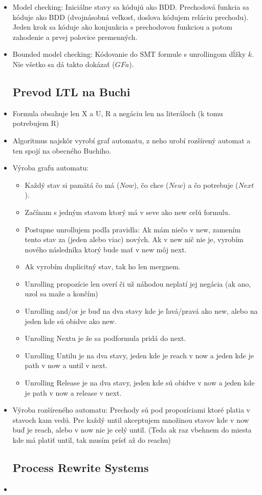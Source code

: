 \documentclass[paper=a4, fontsize=11pt]{scrartcl} %
\numberwithin{equation}{section} %
\numberwithin{figure}{section} %
\numberwithin{table}{section} %
\begin{document}
\begin{itemize}
	\item Model checking: Iniciálne stavy sa kódujú ako BDD. Prechodová funkcia sa kóduje ako BDD (dvojnásobná veľkosť, doslova kódujem reláciu prechodu). Jeden krok sa kóduje ako konjunkcia s prechodovou funkciou a potom zahodenie a prvej polovice premenných.
	
	\item Bounded model checking: Kódovanie do SMT formule s unrollingom dĺžky $k$. Nie všetko sa dá takto dokázať ($GF a$).
	
	\subsection{Prevod LTL na Buchi}
	
	\item Formula obsahuje len X a U, R a negáciu len na literáloch (k tomu potrebujem R)
	
	\item Algoritmus najskôr vyrobí graf automatu, z neho urobí rozšírený automat a ten spojí na obecného Buchiho.
	
	\item Výroba grafu automatu:
	
	\begin{itemize}
		\item Každý stav si pamätá čo má ($Now$), čo chce ($New$) a čo potrebuje ($Next$).
		\item Začínam s jedným stavom ktorý má v seve ako new celú formulu.
		\item Postupne unrollujem podľa pravidla: Ak mám niečo v new, zamením tento stav za (jeden alebo viac) nových. Ak v new nič nie je, vyrobím nového následníka ktorý bude mať v new môj next.
		\item Ak vyrobím duplicitný stav, tak ho len mergnem.
		\item Unrolling propozície len overí či už náhodou neplatí jej negácia (ak ano, uzol sa maže a končím)
		\item Unrolling and/or je buď na dva stavy kde je ľavá/pravá ako new, alebo na jeden kde sú obidve ako new.
		\item Unrolling Nextu je že sa podformula pridá do next.
		\item Unrolling Untilu je na dva stavy, jeden kde je reach v now a jeden kde je path v now a until v next.
		\item Unrolling Release je na dva stavy, jeden kde sú obidve v now a jeden kde je path v now a release v next.
	\end{itemize}

	\item Výroba rozšíreného automatu: Prechody sú pod propozíciami ktoré platia v stavoch kam vedú. Pre každý until akceptujem množinou stavov kde v now buď je reach, alebo v now nie je celý until. (Teda ak raz vbehnem do miesta kde má platiť until, tak musím prísť až do reachu)

	\subsection{Process Rewrite Systems}
	
	\item 
\end{itemize}
\end{document}
